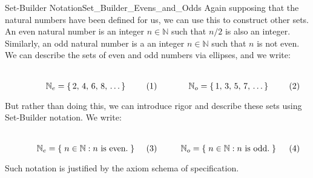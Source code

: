         \begin{lexample}{Set-Builder Notation}{Set_Builder_Evens_and_Odds}
            Again supposing that the natural numbers have been defined for us,
            we can use this to construct other sets. An even natural number
            is an integer $n\in\mathbb{N}$ such that $n/2$ is also an integer.
            Similarly, an odd natural number is a an integer $n\in\mathbb{N}$
            such that $n$ is not even. We can describe the sets of even and
            odd numbers via ellipses, and we write:
            \par
            \begin{subequations}
                \begin{minipage}[b]{0.49\textwidth}
                    \centering
                    \begin{equation}
                        \mathbb{N}_{e}=\{\,2,\,4,\,6,\,8,\,\dots\,\}
                    \end{equation}
                \end{minipage}
                \hfill
                \begin{minipage}[b]{0.49\textwidth}
                    \centering
                    \begin{equation}
                        \mathbb{N}_{o}=\{\,1,\,3,\,5,\,7,\,\dots\,\}
                    \end{equation}
                \end{minipage}
            \end{subequations}
            \par\vspace{2.5ex}
            But rather than doing this, we can introduce rigor and describe
            these sets using Set-Builder notation. We write:
            \par
            \begin{subequations}
                \begin{minipage}[b]{0.49\textwidth}
                    \centering
                    \begin{equation}
                        \mathbb{N}_{e}=\{\;n\in\mathbb{N}:
                                           n\textrm{ is even.}\;\}
                    \end{equation}
                \end{minipage}
                \hfill
                \begin{minipage}[b]{0.49\textwidth}
                    \centering
                    \begin{equation}
                        \mathbb{N}_{o}=\{\;n\in\mathbb{N}:
                                           n\textrm{ is odd.}\;\}
                    \end{equation}
                \end{minipage}
            \end{subequations}
            \par\vspace{2.5ex}
            Such notation is justified by the axiom schema of specification.
        \end{lexample}
